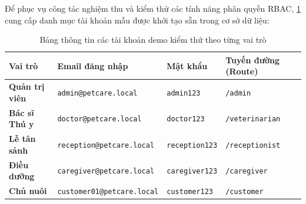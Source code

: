 Để phục vụ công tác nghiệm thu và kiểm thử các tính năng phân quyền RBAC, \cref{tab:test_accounts} cung cấp danh mục tài khoản mẫu được khởi tạo sẵn trong cơ sở dữ liệu:

\begin{table}[htbp]
\centering
\caption{Bảng thông tin các tài khoản demo kiểm thử theo từng vai trò}
\label{tab:test_accounts}
\begin{tabularx}{\textwidth}{l p{4.6cm} l X}
    \toprule
    \textbf{Vai trò} & \textbf{Email đăng nhập} & \textbf{Mật khẩu} & \textbf{Tuyến đường (Route)} \\
    \midrule
    \textbf{Quản trị viên} & \texttt{admin@petcare.local} & \texttt{admin123} & \texttt{/admin} \\
    \textbf{Bác sĩ Thú y} & \texttt{doctor@petcare.local} & \texttt{doctor123} & \texttt{/veterinarian} \\
    \textbf{Lễ tân sảnh} & \texttt{reception@petcare.local} & \texttt{reception123} & \texttt{/receptionist} \\
    \textbf{Điều dưỡng} & \texttt{caregiver@petcare.local} & \texttt{caregiver123} & \texttt{/caregiver} \\
    \textbf{Chủ nuôi} & \texttt{customer01@petcare.local} & \texttt{customer123} & \texttt{/customer} \\
    \bottomrule
\end{tabularx}
\end{table}
